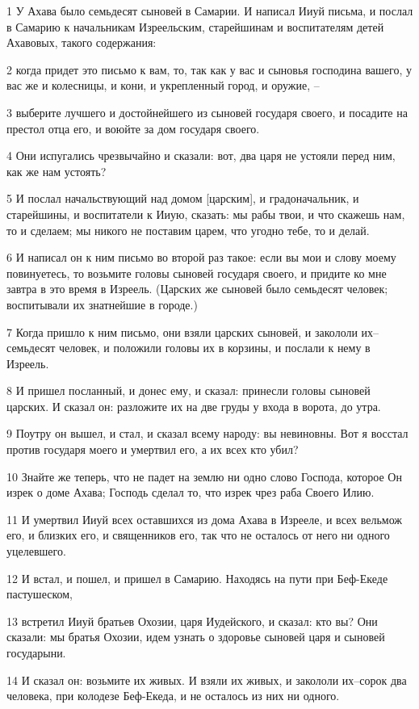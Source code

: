 \par 1 У Ахава было семьдесят сыновей в Самарии. И написал Ииуй письма, и послал в Самарию к начальникам Изреельским, старейшинам и воспитателям детей Ахавовых, такого содержания:
\par 2 когда придет это письмо к вам, то, так как у вас и сыновья господина вашего, у вас же и колесницы, и кони, и укрепленный город, и оружие, --
\par 3 выберите лучшего и достойнейшего из сыновей государя своего, и посадите на престол отца его, и воюйте за дом государя своего.
\par 4 Они испугались чрезвычайно и сказали: вот, два царя не устояли перед ним, как же нам устоять?
\par 5 И послал начальствующий над домом [царским], и градоначальник, и старейшины, и воспитатели к Ииую, сказать: мы рабы твои, и что скажешь нам, то и сделаем; мы никого не поставим царем, что угодно тебе, то и делай.
\par 6 И написал он к ним письмо во второй раз такое: если вы мои и слову моему повинуетесь, то возьмите головы сыновей государя своего, и придите ко мне завтра в это время в Изреель. (Царских же сыновей было семьдесят человек; воспитывали их знатнейшие в городе.)
\par 7 Когда пришло к ним письмо, они взяли царских сыновей, и закололи их--семьдесят человек, и положили головы их в корзины, и послали к нему в Изреель.
\par 8 И пришел посланный, и донес ему, и сказал: принесли головы сыновей царских. И сказал он: разложите их на две груды у входа в ворота, до утра.
\par 9 Поутру он вышел, и стал, и сказал всему народу: вы невиновны. Вот я восстал против государя моего и умертвил его, а их всех кто убил?
\par 10 Знайте же теперь, что не падет на землю ни одно слово Господа, которое Он изрек о доме Ахава; Господь сделал то, что изрек чрез раба Своего Илию.
\par 11 И умертвил Ииуй всех оставшихся из дома Ахава в Изрееле, и всех вельмож его, и близких его, и священников его, так что не осталось от него ни одного уцелевшего.
\par 12 И встал, и пошел, и пришел в Самарию. Находясь на пути при Беф-Екеде пастушеском,
\par 13 встретил Ииуй братьев Охозии, царя Иудейского, и сказал: кто вы? Они сказали: мы братья Охозии, идем узнать о здоровье сыновей царя и сыновей государыни.
\par 14 И сказал он: возьмите их живых. И взяли их живых, и закололи их--сорок два человека, при колодезе Беф-Екеда, и не осталось из них ни одного.
